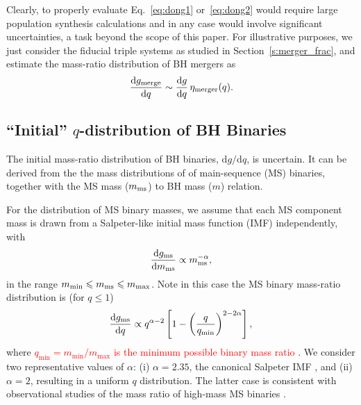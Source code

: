 \documentclass[
        fleqn,
        usenatbib,
    ]{mnras}
\newcommand*{\md}[0]{\mathrm{d}}
\begin{document}
Clearly, to properly evaluate Eq.~\eqref{eq:dong1} or~\eqref{eq:dong2} would
require large population synthesis calculations and in any case would involve
significant uncertainties, a task beyond the scope of this paper. For
illustrative purposes, we just consider the fiducial triple systems as studied
in Section~\ref{s:merger_frac}, and estimate the mass-ratio distribution of BH
mergers as
\begin{equation}
   {\md g_{\rm merge}\over \md q}\sim {\md g\over \md q}\, \eta_{\rm merger}(q).
    \label{eq:gmerge_dq}
\end{equation}

\subsection{``Initial'' $q$-distribution of BH Binaries}\label{ss:qdist_init}

The initial mass-ratio distribution of BH binaries, $\md g/\md q$, is uncertain.
It can be derived from the the mass distributions of of main-sequence (MS)
binaries, together with the MS mass ($m_{\rm ms}$) to BH mass ($m$) relation.

For the distribution of MS binary masses, we assume that each MS component mass
is drawn from a Salpeter-like initial mass function (IMF) independently, with
\begin{equation}
    {\md g_{\rm ms} \over \md m_{\rm ms} }\propto m_{\rm ms}^{-\alpha},
        \label{eq:def_alpha}
\end{equation}
in the range $m_{\min}\le m_{\rm ms} \leq m_{\max}$. Note in this case the MS
binary mass-ratio distribution is (for $q\leq 1$)
\begin{equation}
    {\md g_{\rm ms}\over \md q}\propto q^{\alpha -2}
        \left[ 1-\left( \frac{q}{q_{\min}}\right)^{2-2\alpha}\right],
\end{equation}
where \textcolor{red}{$q_{\min} = m_{\min}/m_{\max}$ is the minimum possible
binary mass ratio} \citep[this is a generalization of the result
of][]{tout_dist}. We consider two representative values of $\alpha$: (i) $\alpha
= 2.35$, the canonical Salpeter IMF \citep{salpeter1955luminosity}, and (ii)
$\alpha = 2$, resulting in a uniform $q$ distribution. The latter case is
consistent with observational studies of the mass ratio of high-mass MS binaries
\citep{sana2012binary, duchene2013, kobulnicky2014, moe2017mind}.
\end{document}
